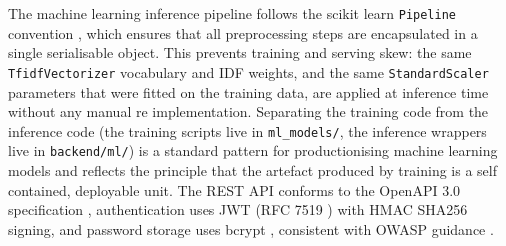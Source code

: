 The machine learning inference pipeline follows the scikit learn
\texttt{Pipeline} convention \cite{buitinck2013api}, which ensures that
all preprocessing steps are encapsulated in a single serialisable
object. This prevents training and serving skew: the same
\texttt{TfidfVectorizer} vocabulary and IDF weights, and the same
\texttt{StandardScaler} parameters that were fitted on the training
data, are applied at inference time without any manual re
implementation. Separating the training code from the inference code
(the training scripts live in \texttt{ml\_models/}, the inference
wrappers live in \texttt{backend/ml/}) is a standard pattern for
productionising machine learning models and reflects the principle
that the artefact produced by training is a self contained, deployable
unit. The REST API conforms to the OpenAPI 3.0 specification
\cite{openapi2025}, authentication uses JWT (RFC 7519 \cite{jwt2015})
with HMAC SHA256 signing, and password storage uses bcrypt
\cite{provos1999bcrypt}, consistent with OWASP guidance
\cite{owasp2021}.